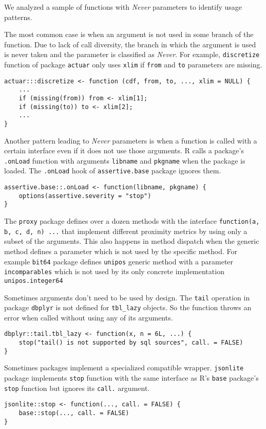 \documentclass[screen,acmsmall]{acmart}
\newcommand{\never}{\emph{Never}\xspace}
\newcommand{\code}[1]{\lstinline[style=R]|#1|\xspace}
\begin{document}
We analyzed a sample of functions with \never parameters to identify usage
patterns.

The most common case is when an argument is not used in some branch of the
function. Due to lack of call diversity, the branch in which the argument is
used is never taken and the parameter is classified as \never. For example,
\code{discretize} function of package \code{actuar} only uses \code{xlim} if
\code{from} and \code{to} parameters are missing.
\begin{lstlisting}
actuar:::discretize <- function (cdf, from, to, ..., xlim = NULL) {
    ...
    if (missing(from)) from <- xlim[1];
    if (missing(to)) to <- xlim[2];
    ...
}
\end{lstlisting}


Another pattern leading to \never parameters is when a function is called with a
certain interface even if it does not use those arguments. R calls a package's
\code{.onLoad} function with arguments \code{libname} and \code{pkgname} when
the package is loaded. The \code{.onLoad} hook of \code{assertive.base} package
ignores them.
\begin{lstlisting}
assertive.base::.onLoad <- function(libname, pkgname) {
    options(assertive.severity = "stop")
}
\end{lstlisting}

The \code{proxy} package defines over a dozen methods with the interface
\code{function(a, b, c, d, n) ...} that implement different proximity metrics by
using only a subset of the arguments.
This also happens in method dispatch when the generic method defines a parameter
which is not used by the specific method. For example \code{bit64} package
defines \code{unipos} generic method with a parameter \code{incomparables} which
is not used by its only concrete implementation \code{unipos.integer64}


Sometimes arguments don't need to be used by design.
The \code{tail} operation in package \code{dbplyr} is not defined for
\code{tbl_lazy} objects. So the function throws an error when called without
using any of its arguments.
\begin{lstlisting}
dbplyr::tail.tbl_lazy <- function(x, n = 6L, ...) {
    stop("tail() is not supported by sql sources", call. = FALSE)
}
\end{lstlisting}

Sometimes packages implement a specialized compatible wrapper.
\code{jsonlite} package implements \code{stop} function with the same interface
as R's \code{base} package's \code{stop} function but ignores its \code{call.}
argument.
\begin{lstlisting}
jsonlite::stop <- function(..., call. = FALSE) {
    base::stop(..., call. = FALSE)
}
\end{lstlisting}
\end{document}
